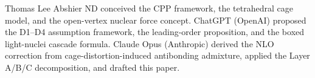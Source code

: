 \documentclass[11pt,letterpaper]{article}
\begin{document}
Thomas Lee Abshier ND conceived the CPP framework, the
tetrahedral cage model, and the open-vertex nuclear force
concept.  ChatGPT (OpenAI) proposed the D1--D4 assumption
framework, the leading-order proposition, and the boxed
light-nuclei cascade formula.  Claude Opus (Anthropic)
derived the NLO correction from cage-distortion-induced
antibonding admixture, applied the Layer A/B/C decomposition,
and drafted this paper.


\end{document}
